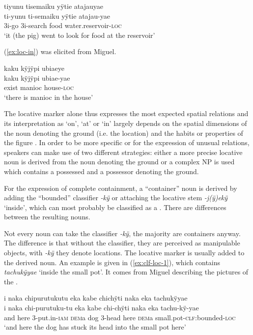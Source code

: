 \ea\label{ex:loc-at}
\begingl
\glpreamble tiyunu tisemaiku yÿtie atajauyae\\
\gla ti-yunu ti-semaiku yÿtie atajau-yae\\
\glb 3i-go 3i-search food water.reservoir-\textsc{loc}\\
\glft ‘it (the pig) went to look for food at the reservoir’
\endgl
\trailingcitation{[rxx-e181024l]}%
\xe


(\ref{ex:loc-in}) was elicited from Miguel.

\ea\label{ex:loc-in}
\begingl
\glpreamble kaku kÿjÿpi ubiaeye\\
\gla kaku kÿjÿpi ubiae-yae\\
\glb exist manioc house-\textsc{loc}\\
\glft ‘there is manioc in the house’
\endgl
\trailingcitation{[mxx-e160811sd.073]}%
\xe

The locative marker alone thus expresses the most expected spatial relations and its interpretation as ‘on’, ‘at’ or ‘in’ largely depends on the spatial dimensions of the noun denoting the ground (i.e. the location) and the habits or properties of the figure \citep[cf.][69]{Admiraal2016}. In order to be more specific or for the expression of unusual relations, speakers can make use of two different strategies: either a more precise locative noun is derived from the noun denoting the ground or a complex NP is used which contains a possessed  and a possessor denoting the ground.

For the expression of complete containment, a “container” noun is derived by adding the “bounded” classifier \textit{-kÿ} or attaching the locative stem \textit{-j(ÿ)ekÿ} ‘inside’, which can most probably be classified as a . There are differences between the resulting nouns.

Not every noun can take the classifier \textit{-kÿ}, the majority are containers anyway. The difference is that without the classifier, they are perceived as manipulable objects, with \textit{-kÿ} they denote locations. The locative marker is usually added to the derived noun. An example is given in (\ref{ex:clf-loc-1}), which contains \textit{tachukÿyae} ‘inside the small pot’. It comes from Miguel describing the pictures of the .

\ea\label{ex:clf-loc-1}
\begingl
\glpreamble i naka chipurutukutu eka kabe chichÿti naka eka tachukÿyae\\
\gla i naka chi-purutuku-tu eka kabe chi-chÿti naka eka tachu-kÿ-yae\\
\glb and here 3-put.in-\textsc{iam} \textsc{dem}a dog 3-head here \textsc{dem}a small.pot-\textsc{clf:}bounded-\textsc{loc}\\
\glft ‘and here the dog has stuck its head into the small pot here’
\endgl
\trailingcitation{[mox-a110920l-2.052]}
\xe

